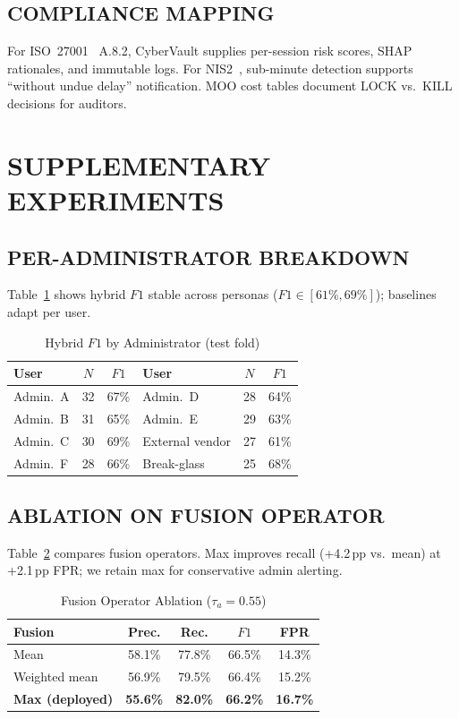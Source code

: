 \subsection{COMPLIANCE MAPPING}
For ISO~27001~\cite{ref28} A.8.2, CyberVault supplies per-session risk scores, SHAP rationales, and immutable logs. For NIS2~\cite{ref29}, sub-minute detection supports ``without undue delay'' notification. MOO cost tables document LOCK vs.\ KILL decisions for auditors.

\section{SUPPLEMENTARY EXPERIMENTS}
\label{art-sec:supplementary}

\subsection{PER-ADMINISTRATOR BREAKDOWN}
Table~\ref{art-tab:per-user} shows hybrid $F1$ stable across personas ($F1\in[61\%,69\%]$); baselines adapt per user.

\begin{table}[H]
\caption{Hybrid $F1$ by Administrator (test fold)}
\label{art-tab:per-user}
\centering
\scriptsize
\begin{tabular}{@{}lcc|lcc@{}}
\toprule
\textbf{User} & $N$ & $F1$ & \textbf{User} & $N$ & $F1$ \\
\midrule
Admin.~A & 32 & 67\% & Admin.~D & 28 & 64\% \\
Admin.~B & 31 & 65\% & Admin.~E & 29 & 63\% \\
Admin.~C & 30 & 69\% & External vendor & 27 & 61\% \\
Admin.~F & 28 & 66\% & Break-glass & 25 & 68\% \\
\bottomrule
\end{tabular}
\end{table}

\subsection{ABLATION ON FUSION OPERATOR}
Table~\ref{art-tab:fusion-ablation} compares fusion operators. Max improves recall (+4.2\,pp vs.\ mean) at +2.1\,pp FPR; we retain max for conservative admin alerting.

\begin{table}[H]
\caption{Fusion Operator Ablation ($\tau_a=0.55$)}
\label{art-tab:fusion-ablation}
\centering
\scriptsize
\begin{tabular}{@{}lcccc@{}}
\toprule
\textbf{Fusion} & Prec. & Rec. & $F1$ & FPR \\
\midrule
Mean & 58.1\% & 77.8\% & 66.5\% & 14.3\% \\
Weighted mean & 56.9\% & 79.5\% & 66.4\% & 15.2\% \\
\textbf{Max (deployed)} & \textbf{55.6\%} & \textbf{82.0\%} & \textbf{66.2\%} & \textbf{16.7\%} \\
\bottomrule
\end{tabular}
\end{table}

